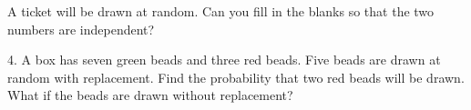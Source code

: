 \documentclass[10pt]{article}
\begin{document}
A ticket will be drawn at random.  Can you fill in the blanks so that 
the two numbers are independent?
\vspace{1in}

4. A box has seven green beads and three red beads.  Five beads are drawn at random with replacement.
Find the probability that two red beads will be drawn.
What if the beads are drawn without replacement?

\vfill
\eject          
\end{document}
